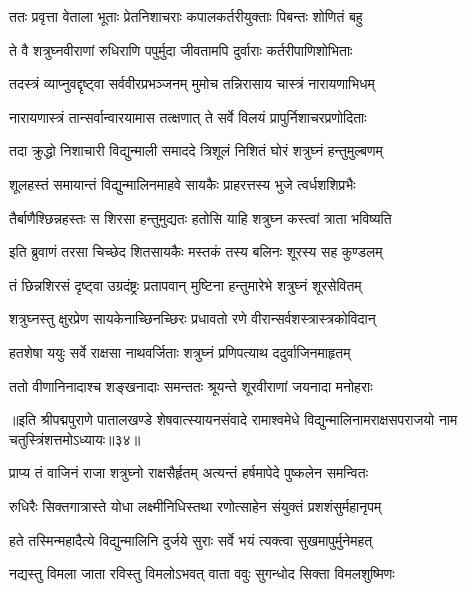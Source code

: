 \twolineshloka
{ततः प्रवृत्ता वेताला भूताः प्रेतनिशाचराः}
{कपालकर्तरीयुक्ताः पिबन्तः शोणितं बहु}%

\twolineshloka
{ते वै शत्रुघ्नवीराणां रुधिराणि पपुर्मुदा}
{जीवतामपि दुर्वाराः कर्तरीपाणिशोभिताः}%

\twolineshloka
{तदस्त्रं व्याप्नुवद्दृष्ट्वा सर्ववीरप्रभञ्जनम्}
{मुमोच तन्निरासाय चास्त्रं नारायणाभिधम्}%

\twolineshloka
{नारायणास्त्रं तान्सर्वान्वारयामास तत्क्षणात्}
{ते सर्वे विलयं प्रापुर्निशाचरप्रणोदिताः}%

\twolineshloka
{तदा क्रुद्धो निशाचारी विद्युन्माली समाददे}
{त्रिशूलं निशितं घोरं शत्रुघ्नं हन्तुमुल्बणम्}%

\twolineshloka
{शूलहस्तं समायान्तं विद्युन्मालिनमाहवे}
{सायकैः प्राहरत्तस्य भुजे त्वर्धशशिप्रभैः}%

\twolineshloka
{तैर्बाणैश्छिन्नहस्तः स शिरसा हन्तुमुद्यतः}
{हतोसि याहि शत्रुघ्न कस्त्वां त्राता भविष्यति}%

\twolineshloka
{इति ब्रुवाणं तरसा चिच्छेद शितसायकैः}
{मस्तकं तस्य बलिनः शूरस्य सह कुण्डलम्}%

\twolineshloka
{तं छिन्नशिरसं दृष्ट्वा उग्रदंष्ट्रः प्रतापवान्}
{मुष्टिना हन्तुमारेभे शत्रुघ्नं शूरसेवितम्}%

\twolineshloka
{शत्रुघ्नस्तु क्षुरप्रेण सायकेनाच्छिनच्छिरः}
{प्रधावतो रणे वीरान्सर्वशस्त्रास्त्रकोविदान्}%

\twolineshloka
{हतशेषा ययुः सर्वे राक्षसा नाथवर्जिताः}
{शत्रुघ्नं प्रणिपत्याथ ददुर्वाजिनमाहृतम्}%

\twolineshloka
{ततो वीणानिनादाश्च शङ्खनादाः समन्ततः}
{श्रूयन्ते शूरवीराणां जयनादा मनोहराः}%

{॥इति श्रीपद्मपुराणे पातालखण्डे शेषवात्स्यायनसंवादे रामाश्वमेधे विद्युन्मालिनामराक्षसपराजयो नाम चतुस्त्रिंशत्तमोऽध्यायः॥३४॥}

\resetShloka


\twolineshloka
{प्राप्य तं वाजिनं राजा शत्रुघ्नो राक्षसैर्हृतम्}
{अत्यन्तं हर्षमापेदे पुष्कलेन समन्वितः}%

\twolineshloka
{रुधिरैः सिक्तगात्रास्ते योधा लक्ष्मीनिधिस्तथा}
{रणोत्साहेन संयुक्तं प्रशशंसुर्महानृपम्}%

\twolineshloka
{हते तस्मिन्महादैत्ये विद्युन्मालिनि दुर्जये}
{सुराः सर्वे भयं त्यक्त्वा सुखमापुर्मुनेमहत्}%

\twolineshloka
{नद्यस्तु विमला जाता रविस्तु विमलोऽभवत्}
{वाता ववुः सुगन्धोद सिक्ता विमलशुष्मिणः}%

